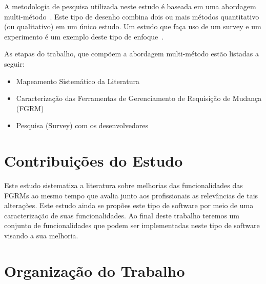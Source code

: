 A metodologia de pesquisa utilizada neste estudo é baseada em uma abordagem
multi-método~\cite{hesse2010mixed}. Este tipo de desenho combina dois ou mais
métodos quantitativo (ou qualitativo) em um único estudo. Um estudo que faça uso
de um survey e um experimento é um exemplo deste tipo de
enfoque~\cite{hesse2010mixed}.


As etapas do trabalho, que compõem a abordagem multi-método estão listadas a
seguir:

\begin{itemize}[(i)]
	\item Mapeamento Sistemático da Literatura~\cite{Petersen2008}
	\item Caracterização das Ferramentas de Gerenciamento de Requisição de
		Mudança (FGRM)
	\item Pesquisa (Survey) com os
		desenvolvedores~\cite{wohlin2012experimentation}
\end{itemize}

\section{Contribuições do Estudo}
\label{sec:intro-contribuicao}

Este estudo sistematiza a literatura sobre melhorias das funcionalidades das
FGRMs ao mesmo tempo que avalia junto aos profissionais as relevâncias de tais
alterações. Este estudo ainda se propões este tipo de software por meio de uma
caracterização de suas funcionalidades. Ao final deste trabalho teremos um
conjunto de funcionalidades que podem ser implementadas neste tipo de software
visando a sua melhoria.

\section{Organização do Trabalho}
\label{sec:intro-organizacao-dissertacao}

